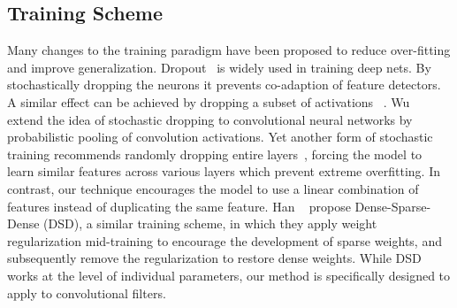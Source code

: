 \subsection{Training Scheme }
Many changes to the training paradigm have been proposed to reduce over-fitting and improve generalization.
Dropout~\cite{Wu2015TowardsDT} is widely used in training deep nets. 
By stochastically dropping the neurons it prevents co-adaption of feature detectors.
A similar effect can be achieved by dropping a subset of activations ~\cite{Wan2013RegularizationON}.
Wu \etal~\cite{Wu2015TowardsDT} extend the idea of stochastic dropping to convolutional neural networks by probabilistic pooling of convolution activations.
Yet another form of stochastic training recommends randomly dropping entire layers~\cite{Huang2016DeepNW}, forcing the model to learn similar features across various layers which prevent extreme overfitting.
In contrast, our technique encourages the model to use a linear combination of features instead of duplicating the same feature.
Han \etal~\cite{Han2016DSDDT} propose Dense-Sparse-Dense (DSD), a similar training scheme, in which they apply weight regularization mid-training to encourage the development of sparse weights, and subsequently remove the regularization to restore dense weights.
While DSD works at the level of individual parameters, our method is specifically designed to apply to convolutional filters.



